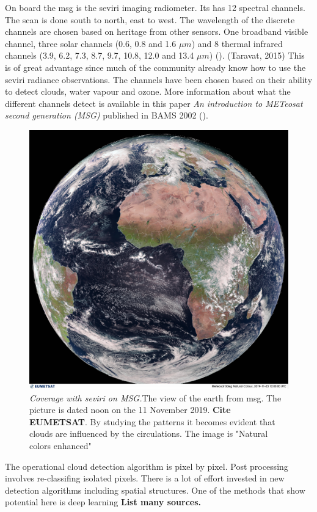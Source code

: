 On board the \acrshort{msg} is the \acrfull{seviri} imaging radiometer. Its has  12 spectral channels. The scan is done south to north, east to west. The wavelength of the discrete channels are chosen based on heritage from other sensors. One broadband visible channel, three solar channels (0.6, 0.8 and 1.6 $\mu m$) and 8 thermal infrared channels (3.9, 6.2, 7.3, 8.7, 9.7, 10.8, 12.0 and 13.4 $\mu m$) (\cite{Taravat2015MultilayerMasking}). (Taravat, 2015)  This is of great advantage since much of the community already know how to use the \acrshort{seviri} radiance observations. The channels have been chosen based on their ability to detect clouds, water vapour and ozone. More information about what the different channels detect is available in this paper \textit{An introduction to METeosat second generation (MSG)} published in BAMS 2002 (\cite{Schmetz_meteosat_intro}). %
\begin{figure}[h]
    \centering
    \includegraphics[scale=0.11]{Chapter2_Theory/images/MET10_RGBNatColourEnhncd_FullResolution_20191123120000.jpg}    
    \caption{\textit{Coverage with \acrshort{seviri} on MSG.}The view of the earth from \acrshort{msg}. The picture is dated noon on the 11 November 2019. \textbf{Cite EUMETSAT}. By studying the patterns it becomes evident that clouds are influenced by the circulations. The image is "Natural colors enhanced"}
    \label{fig:sat_view}
\end{figure}
The operational cloud detection algorithm is pixel by pixel. Post processing involves re-classifing isolated pixels. There is a lot of effort invested in new detection algorithms including spatial structures. One of the methods that show potential here is deep learning \textbf{List many sources.}

